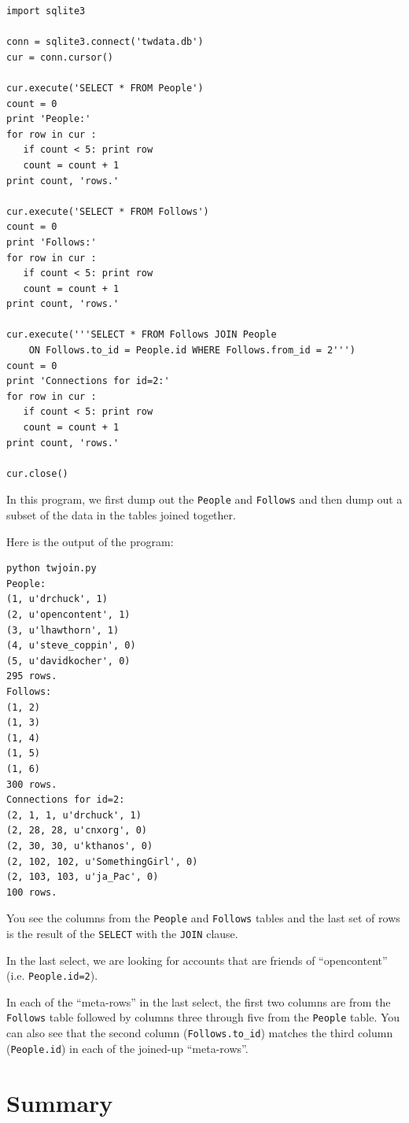 \documentclass[11pt]{book}
\begin{document}
\beforeverb
\begin{verbatim}
import sqlite3

conn = sqlite3.connect('twdata.db')
cur = conn.cursor()

cur.execute('SELECT * FROM People')
count = 0
print 'People:'
for row in cur :
   if count < 5: print row
   count = count + 1
print count, 'rows.'

cur.execute('SELECT * FROM Follows')
count = 0
print 'Follows:'
for row in cur :
   if count < 5: print row
   count = count + 1
print count, 'rows.'

cur.execute('''SELECT * FROM Follows JOIN People 
    ON Follows.to_id = People.id WHERE Follows.from_id = 2''')
count = 0
print 'Connections for id=2:'
for row in cur :
   if count < 5: print row
   count = count + 1
print count, 'rows.'

cur.close()
\end{verbatim}
\afterverb
%
In this program, we first dump out the {\tt People}
and {\tt Follows} and then dump out a subset of the
data in the tables joined together.

Here is the output of the program:

\beforeverb
\begin{verbatim}
python twjoin.py 
People:
(1, u'drchuck', 1)
(2, u'opencontent', 1)
(3, u'lhawthorn', 1)
(4, u'steve_coppin', 0)
(5, u'davidkocher', 0)
295 rows.
Follows:
(1, 2)
(1, 3)
(1, 4)
(1, 5)
(1, 6)
300 rows.
Connections for id=2:
(2, 1, 1, u'drchuck', 1)
(2, 28, 28, u'cnxorg', 0)
(2, 30, 30, u'kthanos', 0)
(2, 102, 102, u'SomethingGirl', 0)
(2, 103, 103, u'ja_Pac', 0)
100 rows.
\end{verbatim}
\afterverb
%
You see the columns from the {\tt People} and {\tt Follows} tables and the last
set of rows is the result of the {\tt SELECT} with the {\tt JOIN} clause.

In the last select, we are looking for accounts that are friends of 
``opencontent'' (i.e. {\tt People.id=2}).

In each of the ``meta-rows'' in the last select, the first two columns are
from the {\tt Follows}
table followed by columns three through five from the {\tt People} table.  You can also
see that the second column (\verb"Follows.to_id") matches the third column
({\tt People.id}) in each of the joined-up ``meta-rows''.

\section{Summary}
\end{document}
